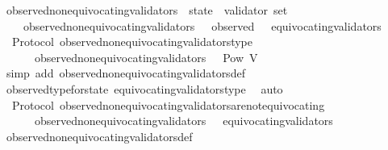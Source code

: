 \begin{isabellebody}
\ observed{\isacharunderscore}non{\isacharunderscore}equivocating{\isacharunderscore}validators\ {\isacharcolon}{\isacharcolon}\ {\isachardoublequoteopen}state\ {\isasymRightarrow}\ validator\ set{\isachardoublequoteclose}\isanewline
\ \ \isanewline
\ \ \ \ {\isachardoublequoteopen}observed{\isacharunderscore}non{\isacharunderscore}equivocating{\isacharunderscore}validators\ {\isasymsigma}\ {\isacharequal}\ observed\ {\isasymsigma}\ {\isacharminus}\ equivocating{\isacharunderscore}validators\ {\isasymsigma}{\isachardoublequoteclose}\isanewline
\isanewline
{}\isamarkupfalse%
\ {\isacharparenleft}\ Protocol{\isacharparenright}\ observed{\isacharunderscore}non{\isacharunderscore}equivocating{\isacharunderscore}validators{\isacharunderscore}type\ {\isacharcolon}\isanewline
\ \ {\isachardoublequoteopen}{\isasymforall}\ {\isasymsigma}\ {\isasymin}\ {\isasymSigma}{\isachardot}\ observed{\isacharunderscore}non{\isacharunderscore}equivocating{\isacharunderscore}validators\ {\isasymsigma}\ {\isasymin}\ Pow\ V{\isachardoublequoteclose}\isanewline
%
\isadelimproof
\ \ %
\endisadelimproof
%
\isatagproof
{}\isamarkupfalse%
\ {\isacharparenleft}simp\ add{\isacharcolon}\ observed{\isacharunderscore}non{\isacharunderscore}equivocating{\isacharunderscore}validators{\isacharunderscore}def{\isacharparenright}\isanewline
\ \ \isamarkupfalse%
\ observed{\isacharunderscore}type{\isacharunderscore}for{\isacharunderscore}state\ equivocating{\isacharunderscore}validators{\isacharunderscore}type\ \isamarkupfalse%
\ auto%
\endisatagproof
{\isafoldproof}%
%
\isadelimproof
\isanewline
%
\endisadelimproof
\isanewline
{}\isamarkupfalse%
\ {\isacharparenleft}\ Protocol{\isacharparenright}\ observed{\isacharunderscore}non{\isacharunderscore}equivocating{\isacharunderscore}validators{\isacharunderscore}are{\isacharunderscore}not{\isacharunderscore}equivocating\ {\isacharcolon}\isanewline
\ \ {\isachardoublequoteopen}{\isasymforall}\ {\isasymsigma}\ {\isasymin}\ {\isasymSigma}{\isachardot}\ observed{\isacharunderscore}non{\isacharunderscore}equivocating{\isacharunderscore}validators\ {\isasymsigma}\ {\isasyminter}\ equivocating{\isacharunderscore}validators\ {\isasymsigma}\ {\isacharequal}\ {\isasymemptyset}{\isachardoublequoteclose}\isanewline
%
\isadelimproof
\ \ %
\endisadelimproof
%
\isatagproof
{}\isamarkupfalse%
\ observed{\isacharunderscore}non{\isacharunderscore}equivocating{\isacharunderscore}validators{\isacharunderscore}def\isanewline

\end{isabellebody}
